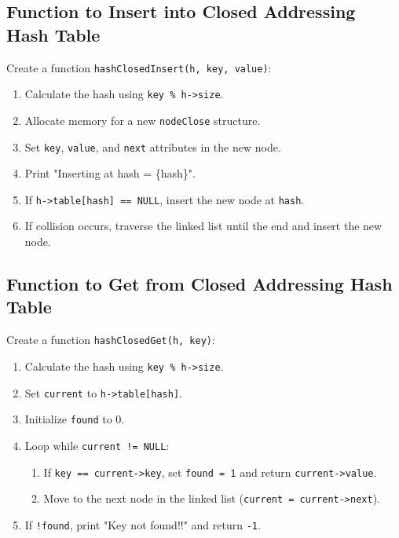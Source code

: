 {  \subsection{Function to Insert into Closed Addressing Hash Table}
  Create a function \texttt{hashClosedInsert(h, key, value)}:
  \begin{enumerate}[label=\arabic*.,left=0pt]
    \item Calculate the hash using \texttt{key \% h->size}.
    \item Allocate memory for a new \texttt{nodeClose} structure.
    \item Set \texttt{key}, \texttt{value}, and \texttt{next} attributes in the new node.
    \item Print "Inserting at hash = \{hash\}".
    \item If \texttt{h->table[hash] == NULL}, insert the new node at \texttt{hash}.
    \item If collision occurs, traverse the linked list until the end and insert the new node.
  \end{enumerate}

  \subsection{Function to Get from Closed Addressing Hash Table}
  Create a function \texttt{hashClosedGet(h, key)}:
  \begin{enumerate}[label=\arabic*.,left=0pt]
    \item Calculate the hash using \texttt{key \% h->size}.
    \item Set \texttt{current} to \texttt{h->table[hash]}.
    \item Initialize \texttt{found} to 0.
    \item Loop while \texttt{current != NULL}:
          \begin{enumerate}[label=2.2.\arabic*.,left=0pt]
            \item If \texttt{key == current->key}, set \texttt{found = 1} and return \texttt{current->value}.
            \item Move to the next node in the linked list (\texttt{current = current->next}).
          \end{enumerate}
    \item If \texttt{!found}, print "Key not found!!" and return \texttt{-1}.
  \end{enumerate}

}
